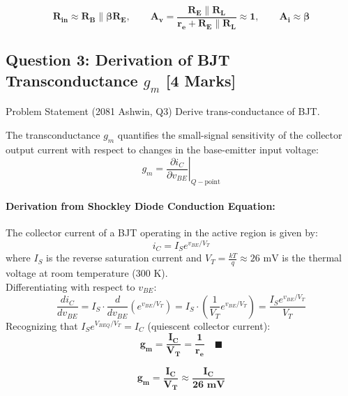 \documentclass[11pt,a4paper,oneside]{book}
\begin{document}
\begin{answerbox}
$$\mathbf{R_{\text{in}} \approx R_B \parallel \beta R_E, \qquad A_v = \frac{R_E \parallel R_L}{r_e + R_E \parallel R_L} \approx 1, \qquad A_i \approx \beta}$$
\end{answerbox}

\vspace{0.6cm}

\subsection{Question 3: Derivation of BJT Transconductance $g_m$ [4 Marks]}
\begin{questionbox}{Problem Statement (2081 Ashwin, Q3)}
Derive trans-conductance of BJT.
\end{questionbox}

The transconductance $g_m$ quantifies the small-signal sensitivity of the collector output current with respect to changes in the base-emitter input voltage:
\[
g_m = \left. \frac{\partial i_C}{\partial v_{BE}} \right|_{Q-\text{point}}
\]
\paragraph{Derivation from Shockley Diode Conduction Equation:}
The collector current of a BJT operating in the active region is given by:
\[
i_C = I_S e^{v_{BE} / V_T}
\]
where $I_S$ is the reverse saturation current and $V_T = \frac{kT}{q} \approx 26\text{ mV}$ is the thermal voltage at room temperature ($300\text{ K}$).\\
Differentiating with respect to $v_{BE}$:
\[
\frac{d i_C}{d v_{BE}} = I_S \cdot \frac{d}{d v_{BE}}\left(e^{v_{BE}/V_T}\right) = I_S \cdot \left(\frac{1}{V_T} e^{v_{BE}/V_T}\right) = \frac{I_S e^{v_{BE}/V_T}}{V_T}
\]
Recognizing that $I_S e^{V_{BEQ}/V_T} = I_C$ (quiescent collector current):
\[
\mathbf{g_m = \frac{I_C}{V_T} = \frac{1}{r_e}} \quad \blacksquare
\]

\begin{answerbox}
$$\mathbf{g_m = \frac{I_C}{V_T} \approx \frac{I_C}{26\text{ mV}}}$$
\end{answerbox}

\vspace{0.6cm}

\end{document}
